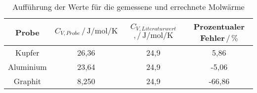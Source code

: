 \begin{table}[h]
\normalsize

\centering
{}
\begin{tabular}{c c c c}
\toprule
        Probe & $C_{V,Probe} \,/\, \si{\joule\per\mole\per\kelvin}$ & $ C_{V,Literaturwert}$ \cite{stocker2004taschenbuch}$,/\, \si{\joule\per\mole\per\kelvin}$ & Prozentualer Fehler$\,/\, \% $\\
        \midrule
        Kupfer      &   26,36   &   24,9   &     5,86\\
        Aluminium   &   23,64   &   24,9   &    -5,06\\
        Graphit     &   8,250   &   24,9   &   -66,86\\

\bottomrule

\end{tabular}

\caption{Aufführung der Werte für die gemessene und errechnete Molwärme}
\label{tab:werte2}
\end{table}